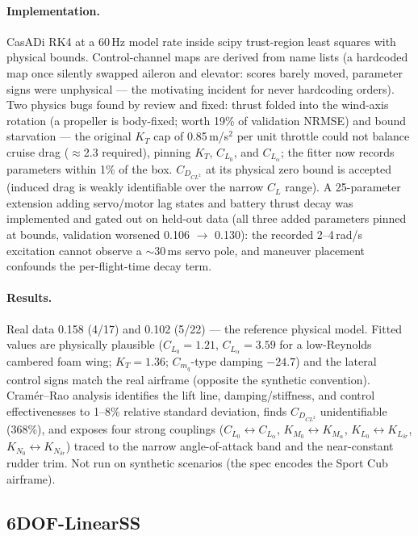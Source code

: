 \documentclass[11pt]{article}
\begin{document}
\paragraph{Implementation.} CasADi RK4 at a 60\,Hz model rate inside scipy
trust-region least squares with physical bounds. Control-channel maps are
derived from name lists (a hardcoded map once silently swapped aileron and
elevator: scores barely moved, parameter signs were unphysical --- the
motivating incident for never hardcoding orders). Two physics bugs found by
review and fixed: thrust folded into the wind-axis rotation (a propeller is
body-fixed; worth 19\% of validation NRMSE) and bound starvation ---
the original $K_T$ cap of 0.85\,m/s$^2$ per unit throttle could not balance
cruise drag ($\approx$2.3 required), pinning $K_T$, $C_{L_0}$, and
$C_{L_\alpha}$; the fitter now records parameters within 1\% of the box.
$C_{D_{CL^2}}$ at its physical zero bound is accepted (induced drag is
weakly identifiable over the narrow $C_L$ range). A 25-parameter extension
adding servo/motor lag states and battery thrust decay was implemented and
gated out on held-out data (all three added parameters pinned at bounds,
validation worsened 0.106 $\rightarrow$ 0.130): the recorded 2--4\,rad/s
excitation cannot observe a $\sim$30\,ms servo pole, and maneuver
placement confounds the per-flight-time decay term.
\paragraph{Results.} Real data 0.158 (4/17) and 0.102 (5/22) --- the
reference physical model. Fitted values are physically plausible
($C_{L_0}=1.21$, $C_{L_\alpha}=3.59$ for a low-Reynolds cambered foam wing;
$K_T=1.36$; $C_{m_q}$-type damping $-24.7$) and the lateral control signs
match the real airframe (opposite the synthetic convention).
Cram\'er--Rao analysis identifies the lift line, damping/stiffness, and
control effectivenesses to 1--8\% relative standard deviation, finds
$C_{D_{CL^2}}$ unidentifiable (368\%), and exposes four strong couplings
($C_{L_0}\!\leftrightarrow\!C_{L_\alpha}$,
$K_{M_0}\!\leftrightarrow\!K_{M_\alpha}$,
$K_{L_0}\!\leftrightarrow\!K_{L_{\delta r}}$,
$K_{N_0}\!\leftrightarrow\!K_{N_{\delta r}}$) traced to the narrow
angle-of-attack band and the near-constant rudder trim. Not run on
synthetic scenarios (the spec encodes the Sport Cub airframe).

\subsection{6DOF-LinearSS}
\end{document}
